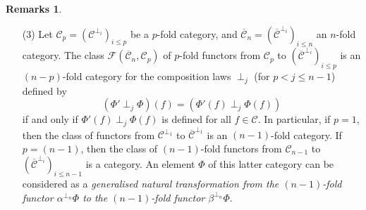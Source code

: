 \documentclass[a4paper,fleqn]{article}
\theoremstyle{plain}
\theoremstyle{definition}
\newtheorem*{remarks}{Remarks}
\newenvironment{longcomm}[1]
  {\noindent\textbf{[#1]}\rmfamily}
  {}
\renewcommand{\leq}{\leqslant}
\newcommand{\oldpage}[1]{{\marginpar{\footnotesize$\bigg\vert$\,\,\,\,\textit{p.~#1}}}}
\newcommand{\textand}{\quad\text{and}\quad}
\newcommand{\CC}{\mathcal{C}}
\newcommand{\FF}{\mathcal{F}}
\newcommand{\boxnum}[1]{{\fbox{\scriptsize${#1}$\vphantom{$jk$}}}}
\newcommand{\hsqbox}{{\boxminus}}
\DeclareMathOperator{\sq}{\square}
\DeclareMathOperator{\hsq}{\raisebox{-.05em}{$\hsqbox$}}
\newcommand{\hmult}{\mathbin{\raisebox{-.05em}{$\hsqbox$}}}
\begin{document}
\begin{remarks}
\begin{enumerate}
\begin{longcomm}{70.5}
        A simpler construction of the $n$-fold category $\CC^\boxnum{n}$ is done on p.~95.
        Cf. also the definition in \cite{coll120} of the functor
        \[
          \operatorname{Square}_{n,m}
          \colon \mathsf{Cat}_n
          \to \mathsf{Cat}_m
        \]
        for $n<m$, where the $n$-fold category $\operatorname{Square}_{n-1,n}\CC^\boxnum{n-1}$ is the same as $\CC^\boxnum{n}$, except for the fact that the first and last compositions are interchanged.
      \end{longcomm}

      The composition law $\perp_i$ on on $\CC^{[n]}$ is the inverse image under $\varepsilon_n^i$ of the longitudinal multiplication on $\varepsilon_n^i(\CC^{[n]})$.
      The composition law $\perp_n$ is defined by
      \[
        (\overline{h}',\overline{k}',\overline{k},\overline{h})
        \perp (h',k',k',h)
        = (\overline{h}'\hmult h', \overline{k}'\hmult k', \overline{k}\hmult k, \overline{h}\hmult h)
      \]
      if and only if $\overline{h}'\hmult h'$, $\overline{k}'\hmult k'$, $\overline{k}\hmult k$, and $\overline{h}\hmult h$ are all defined in $\hsq((\CC^{[n-1]})^{\perp_1},(\CC^{[n-1]})^{\perp_1})$.
      The $n$-fold category $(\CC^{[n]})_{i\leq n}^{\perp_i}$ admits as an $n$-fold subcategory the class $\CC^\boxnum{n}$, defined inductively by
      \[
        \CC^\boxnum{1} = \CC
        \textand
        \CC^\boxnum{n} = \sq\big((\CC^\boxnum{n-1}){^\perp_1}\big).
      \]
      \oldpage{71}
      In particular,
      \[
        \CC^\boxnum{2}
        = \sq\CC.
      \]

    \item[\normalfont(3)]
      Let $\CC_p=(\CC^{\perp_i})_{i\leq p}$ be a $p$-fold category, and $\overline{\CC}_n=(\overline{\CC}^{\perp_i})_{i\leq n}$ an $n$-fold category.
      The class $\FF(\overline{\CC}_n,\CC_p)$ of $p$-fold functors from $\CC_p$ to $(\overline{\CC}^{\perp_i})_{i\leq p}$ is an $(n-p)$-fold category for the composition laws $\perp_j$ (for $p<j\leq n-1$) defined by
      \[
        (\Phi'\perp_j\Phi)(f)
        = (\Phi'(f)\perp_j\Phi(f))
      \]
      if and only if $\Phi'(f)\perp_j\Phi(f)$ is defined for all $f\in\CC$.
      In particular, if $p=1$, then the class of functors from $\CC^{\perp_1}$ to $\overline{\CC}^{\perp_1}$ is an $(n-1)$-fold category.
      If $p=(n-1)$, then the class of $(n-1)$-fold functors from $\CC_{n-1}$ to $(\overline{\CC}^{\perp_i})_{i\leq n-1}$ is a category.
      An element $\Phi$ of this latter category can be considered as a \emph{generalised natural transformation from the $(n-1)$-fold functor $\alpha^{\perp_n}\Phi$ to the $(n-1)$-fold functor $\beta^{\perp_n}\Phi$}.


\end{enumerate}
\end{remarks}
\end{document}

